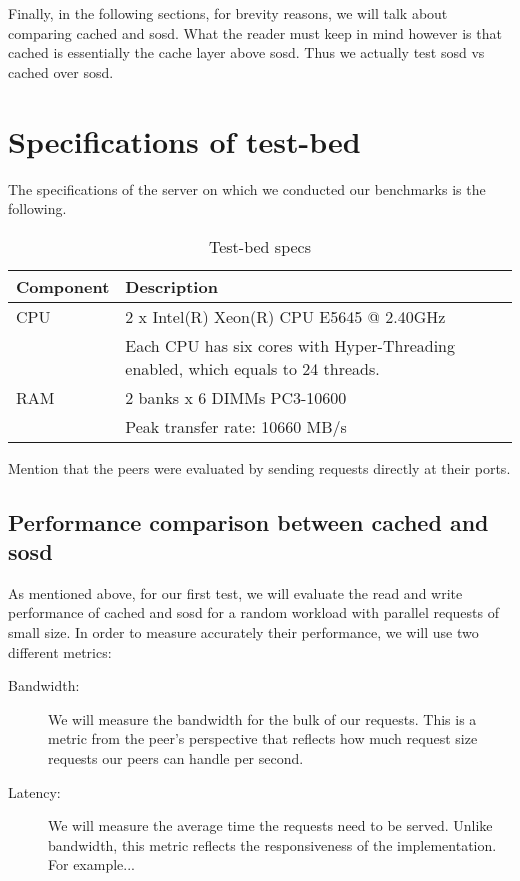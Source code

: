 Finally, in the following sections, for brevity reasons, we will talk about 
comparing cached and sosd. What the reader must keep in mind however is that 
cached is essentially the cache layer above sosd. Thus we actually test sosd vs 
cached over sosd.

\section{Specifications of test-bed}\label{sec:test-bed}

The specifications of the server on which we conducted our benchmarks is the 
following.

\begin{table}[H]
	\centering
	\begin{tabular}{ | l | l | }
		\hline
		Component & Description \\ \hline \hline
		CPU &  2 x Intel(R) Xeon(R) CPU E5645 @ 2.40GHz \cite{e5645} \\
		 & Each CPU has six cores with Hyper-Threading enabled, which equals to 
		 24 threads. \\ \hline
		RAΜ & 2 banks x 6 DIMMs PC3-10600 \\
		& Peak transfer rate: 10660 MB/s \\ \hline
	\end{tabular}
	\caption{Test-bed specs}
	\label{tab:specs}
\end{table}

\fixme Mention that the peers were evaluated by sending requests directly at 
their ports.

\label{sec:perf-plot}
\subsection{Performance comparison between cached and sosd}

As mentioned above, for our first test, we will evaluate the read and write 
performance of cached and sosd for a random workload with parallel requests of 
small size. In order to measure accurately their performance, we will use two 
different metrics:

\begin{description}
	\item[Bandwidth:] We will measure the bandwidth for the bulk of our 
		requests. This is a metric from the peer's perspective that reflects 
		how much request size requests our peers can handle per second.
	\item[Latency:] We will measure the average time the requests need to be 
		served. Unlike bandwidth, this metric reflects the responsiveness of 
		the implementation. For example...
\end{description}


